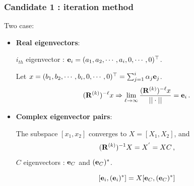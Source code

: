 \documentclass[mathserif, handout]{beamer}
\begin{document}
\begin{frame}
  \frametitle{Candidate 1 : iteration method}

  Two case:
  \begin{itemize}
  \item \textbf{Real eigenvectors}:

    $i_{th}$ eigenvector :
    $\jEigvec[i]=(a_{1},a_{2},\cdots,a_{i},0,\cdots, 0)^\top $.

    \vspace{1em}
    Let $x=(b_{1},b_{2},\cdots,b_{i},0,\cdots, 0)^\top
    =\sum_{j=1}^{i}\alpha_{j}\jEigvec[j]$.
    \[
    (\ps{R}{k})^{-\ell}x
    \Rightarrow
    \lim_{\ell\to \infty} \frac{(\ps{R}{k})^{-\ell}x}{||\cdot||}=\jEigvec[i]
    \,.
    \]

    \pause

  \item \textbf{Complex eigenvector pairs}:

    The subspace $[x_1, x_2]$ converges to $X=[X_{1},X_{2}]$, and
    \[
      (\ps{R}{k})^{-1}X=X^{'}=XC
      \,,
      \label{eq:similar}
    \]
    $C$ eigenvectors : $\jEigvec[C]$ and $(\jEigvec[C])^{*}$.

    \[
    [\jEigvec[i],(\jEigvec[i])^{*}]=X[\jEigvec[C],(\jEigvec[C])^{*}]
    \]
  \end{itemize}



\end{frame}
\end{document}
